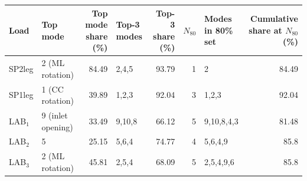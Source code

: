 \begin{tabular}{llrlrrlr}
\toprule
Load & Top mode & Top mode share (\%) & Top-3 modes & Top-3 share (\%) & $N_{80}$ & Modes in 80\% set & Cumulative share at $N_{80}$ (\%) \\
\midrule
SP2leg & 2 (ML rotation) & 84.49 & 2,4,5 & 93.79 & 1 & 2 & 84.49 \\
SP1leg & 1 (CC rotation) & 39.89 & 1,2,3 & 92.04 & 3 & 1,2,3 & 92.04 \\
LAB$_1$ & 9 (inlet opening) & 33.49 & 9,10,8 & 66.12 & 5 & 9,10,8,4,3 & 81.48 \\
LAB$_2$ & 5 & 25.15 & 5,6,4 & 74.77 & 4 & 5,6,4,9 & 85.8 \\
LAB$_3$ & 2 (ML rotation) & 45.81 & 2,5,4 & 68.09 & 5 & 2,5,4,9,6 & 85.8 \\
\bottomrule
\end{tabular}
